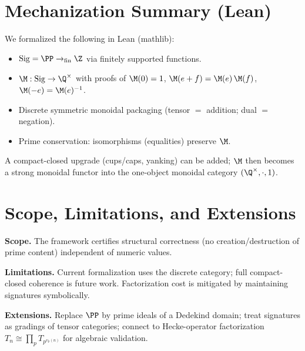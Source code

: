 \documentclass[11pt]{article}
\theoremstyle{definition}
\theoremstyle{plain}
\theoremstyle{remark}
\newcommand{\Sig}{\mathrm{Sig}}
\begin{document}
\section{Mechanization Summary (Lean)}
\label{sec:lean}
We formalized the following in Lean (mathlib):
\begin{itemize}[leftmargin=*]
  \item $\Sig=\PP\to_{\mathrm{fin}}\Z$ via finitely supported functions.
  \item $\M:\Sig\to\Q^{\times}$ with proofs of $\M(0)=1$, $\M(e+f)=\M(e)\,\M(f)$, $\M(-e)=\M(e)^{-1}$.
  \item Discrete symmetric monoidal packaging (tensor $=$ addition; dual $=$ negation).
  \item Prime conservation: isomorphisms (equalities) preserve $\M$.
\end{itemize}
A compact-closed upgrade (cups/caps, yanking) can be added; $\M$ then becomes a strong monoidal functor into the one-object monoidal category $(\Q^{\times},\cdot,1)$.

\section{Scope, Limitations, and Extensions}
\label{sec:extensions}
\textbf{Scope.} The framework certifies structural correctness (no creation/destruction of prime content) independent of numeric values.

\textbf{Limitations.} Current formalization uses the discrete category; full compact-closed coherence is future work. Factorization cost is mitigated by maintaining signatures symbolically.

\textbf{Extensions.} Replace $\PP$ by prime ideals of a Dedekind domain; treat signatures as gradings of tensor categories; connect to Hecke-operator factorization $T_n\cong\prod_p T_{p^{v_p(n)}}$ for algebraic validation.

\appendix
\end{document}
